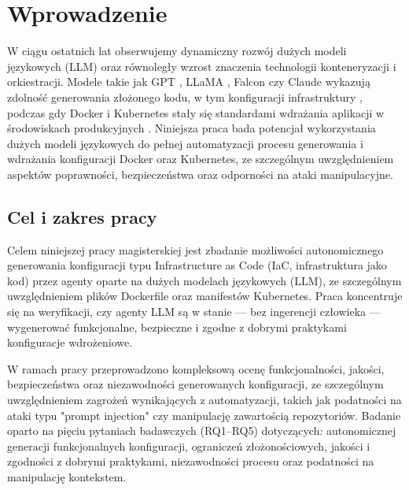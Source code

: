 \clearpage %
\section{Wprowadzenie}

W ciągu ostatnich lat obserwujemy dynamiczny rozwój dużych modeli językowych (LLM) \cite{zhao_survey_2025} oraz równoległy wzrost znaczenia technologii konteneryzacji i orkiestracji. Modele takie jak GPT \cite{brown_language_2020}, LLaMA \cite{touvron_llama_2023}, Falcon \cite{almazrouei_falcon_2023} czy Claude \cite{anthropic_claude} wykazują zdolność generowania złożonego kodu, w tym konfiguracji infrastruktury \cite{srivatsa_survey_2024}, podczas gdy Docker \cite{merkel_docker_nodate} i Kubernetes \cite{burns_borg_2016} stały się standardami wdrażania aplikacji w środowiskach produkcyjnych \cite{kratzke_dont_2024}. Niniejsza praca bada potencjał wykorzystania dużych modeli językowych do pełnej automatyzacji procesu generowania i wdrażania konfiguracji Docker oraz Kubernetes, ze szczególnym uwzględnieniem aspektów poprawności, bezpieczeństwa oraz odporności na ataki manipulacyjne.

\subsection{Cel i zakres pracy}

Celem niniejszej pracy magisterskiej jest zbadanie możliwości autonomicznego generowania konfiguracji typu Infrastructure as Code (IaC, infrastruktura jako kod) \cite{pahl_infrastructure_nodate} przez agenty oparte na dużych modelach językowych (LLM), ze szczególnym uwzględnieniem plików Dockerfile oraz manifestów Kubernetes. Praca koncentruje się na weryfikacji, czy agenty LLM są w stanie — bez ingerencji człowieka — wygenerować funkcjonalne, bezpieczne i zgodne z dobrymi praktykami konfiguracje wdrożeniowe.

W ramach pracy przeprowadzono kompleksową ocenę funkcjonalności, jakości, bezpieczeństwa oraz niezawodności generowanych konfiguracji, ze szczególnym uwzględnieniem zagrożeń wynikających z automatyzacji, takich jak podatności na ataki typu "prompt injection" czy manipulację zawartością repozytoriów. Badanie oparto na pięciu pytaniach badawczych (RQ1–RQ5) dotyczących: autonomicznej generacji funkcjonalnych konfiguracji, ograniczeń złożonościowych, jakości i zgodności z dobrymi praktykami, niezawodności procesu oraz podatności na manipulację kontekstem.

